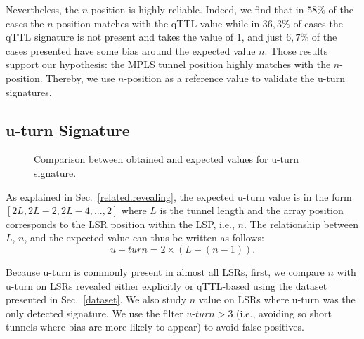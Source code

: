 
Nevertheless, the $n$-position is highly reliable. Indeed, we find that in
$58\%$ of the cases the $n$-position matches with the qTTL value while in
$36,3\%$ of cases the qTTL signature is not present and takes the value of $1$,
and just $6,7\%$ of the cases presented have some bias around the expected value
$n$. Those results support our hypothesis: the  MPLS tunnel position highly
matches with the $n$-position. Thereby,  we use $n$-position as a reference
value to validate the u-turn signatures.

\subsection{u-turn Signature}\label{validation.uturn}
\begin{figure}[!t]
  \begin{center}    
\hspace{-0.3cm}      
  \end{center}
  \caption{Comparison between obtained and expected values for u-turn
  signature.}
  \label{validation.uturn.fig}
\end{figure}

As explained in Sec.~\ref{related.revealing},  the expected u-turn value is in
the form $[2L, 2L-2, 2L-4,..., 2]$ where $L$ is the tunnel length and the array
position corresponds to the LSR position within the LSP, i.e., $n$.  The
relationship between $L$, $n$, and the expected value can thus be written as
follows:
\begin{equation}
u-turn = 2 \times (L - (n-1)) .
\label{eqn.uturn}
\end{equation}


Because u-turn is commonly present in almost all LSRs, first, we compare $n$
with u-turn on LSRs revealed either explicitly or qTTL-based using the dataset
presented in Sec.~\ref{dataset}.  We also study  $n$ value on LSRs where u-turn
was the only detected signature. We use the filter $\textit{u-turn}>3$ (i.e.,
avoiding so short tunnels where bias are more likely to appear) to avoid false
positives.

